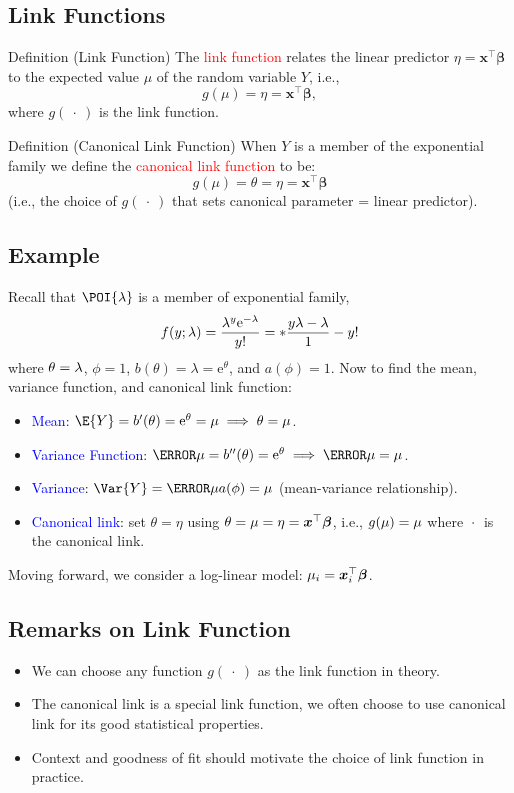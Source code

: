 \documentclass{article}\usepackage[]{graphicx}\usepackage[svgnames]{xcolor}
\let\exp\relax%
\let\log\relax%
\providecommand{\Vector}[1]{\bm{#1}}%
\begin{document}
\subsection*{Link Functions}
\begin{Regular}{Definition (Link Function)}
    The \textcolor{Red}{link function} relates the linear predictor $ \eta=\Vector{x}^\top\Vector{\beta} $ to the expected value $ \mu $ of the random variable $ Y $, i.e.,
    \[ g(\mu)=\eta=\Vector{x}^\top\Vector{\beta}, \]
    where $ g(\:\cdot\:) $ is the link function.
\end{Regular}
\begin{Regular}{Definition (Canonical Link Function)}
    When $Y$ is a member of the exponential family we define the \textcolor{Red}{canonical link function} to be:
    \[ g(\mu)=\theta=\eta=\Vector{x}^\top\Vector{\beta} \]
    (i.e., the choice of $ g(\:\cdot\:) $ that sets canonical parameter = linear predictor).
\end{Regular}
\subsection*{Example}
Recall that $ \POI{\lambda} $ is a member of exponential family,
\[ f(y;\lambda)=\frac{\lambda^y \mathrm{e}^{-\lambda}}{y!}=\exp*{\frac{y\log{\lambda}-\lambda}{1}-\log{y!}}  \]
where $ \theta=\log{\lambda} $, $ \phi=1 $, $ b(\theta)=\lambda=\mathrm{e}^{\theta} $, and $ a(\phi)=1 $. Now to find the mean, variance function, and canonical link function:
\begin{itemize}
    \item \textcolor{Blue}{Mean}: $ \E{Y}=b^\prime(\theta)=\mathrm{e}^{\theta}=\mu\implies \theta=\log{\mu} $.
    \item \textcolor{Blue}{Variance Function}: $ \V{\mu}=b^{\prime\prime}(\theta)=\mathrm{e}^{\theta}\implies \V{\mu}=\mu $.
    \item \textcolor{Blue}{Variance}: $ \Var{Y}=\V{\mu}a(\phi)=\mu $ (mean-variance relationship).
    \item \textcolor{Blue}{Canonical link}: set $ \theta=\eta $ using $ \theta=\log{\mu}=\eta=\Vector{x}^\top \Vector{\beta} $, i.e., $ g(\mu)=\log{\mu} $ where $ \log{\:\cdot\:} $
          is the canonical link.
\end{itemize}
Moving forward, we consider a log-linear model: $ \log{\mu_i}=\Vector{x}_i^\top \Vector{\beta} $.

\subsection*{Remarks on Link Function}
\begin{itemize}
    \item We can choose any function $ g(\:\cdot\:) $ as the link function in theory.
    \item The canonical link is a special link function, we often choose to use
          canonical link for its good statistical properties.
    \item Context and goodness of fit should motivate the choice of link function in
          practice.
\end{itemize}
\end{document}
